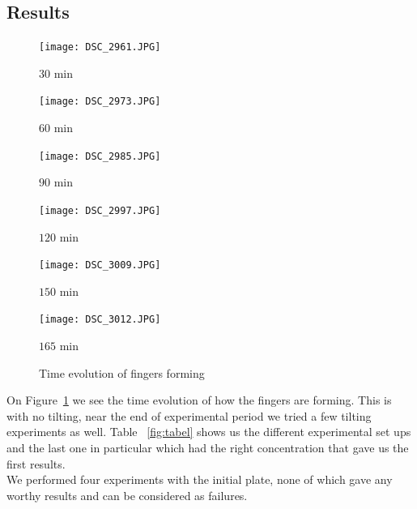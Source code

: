 \documentclass[twoside]{article}
\begin{document}
\begin{multicols}{2}
\section{Results}

\begin{figure}
\centering
\begin{minipage}[b]{0.32\linewidth}
\texttt{[image: DSC\_2961.JPG]}
\caption*{\(30\) min}
\end{minipage}
\begin{minipage}[b]{0.32\linewidth}
\texttt{[image: DSC\_2973.JPG]}
\caption*{\(60\) min}
\end{minipage}
\begin{minipage}[b]{0.32\linewidth}
\texttt{[image: DSC\_2985.JPG]}
\caption*{\(90\) min}
\end{minipage}
\begin{minipage}[b]{0.32\linewidth}
\texttt{[image: DSC\_2997.JPG]}
\caption*{\(120\) min}
\end{minipage}
\begin{minipage}[b]{0.32\linewidth}
\texttt{[image: DSC\_3009.JPG]}
\caption*{\(150\) min}
\end{minipage}
\begin{minipage}[b]{0.32\linewidth}
\texttt{[image: DSC\_3012.JPG]}
\caption*{\(165\) min}
\end{minipage}
\caption{Time evolution of fingers forming}
\label{fig:timevo}
\end{figure}

On Figure~\ref{fig:timevo} we see the time evolution of how the fingers are forming. This is with no tilting, near the end of experimental period we tried a few tilting experiments as well. Table ~\ref{fig:tabel} shows us the different experimental set ups and the last one in particular which had the right concentration that gave us the first results. \\
We performed four experiments with the initial plate, none of which gave any worthy results and can be considered as failures. 


\end{multicols}
\end{document}
